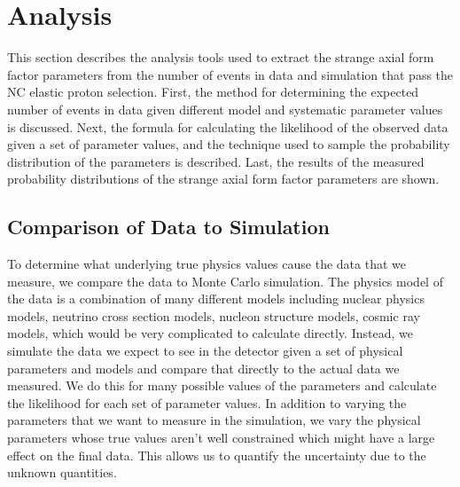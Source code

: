 \section{Analysis}\label{sec:analysis}
\hspace{\parindent}
This section describes the analysis tools used to extract the strange axial
form factor parameters from the number of events in data and simulation that
pass the NC elastic proton selection. First, the method for determining the
expected number of events in data given different model and systematic
parameter values is discussed. Next, the formula for calculating the likelihood
of the observed data given a set of parameter values, and the technique used to
sample the probability distribution of the parameters is described. Last, the
results of the measured probability distributions of the strange axial form
factor parameters are shown.

\subsection{Comparison of Data to Simulation}
  To determine what underlying true physics values cause the data that we
  measure, we compare the data to Monte Carlo simulation. The physics model of
  the data is a combination of many different models including nuclear physics
  models, neutrino cross section models, nucleon structure models, cosmic ray
  models, which would be very complicated to calculate directly.  Instead, we
  simulate the data we expect to see in the detector given a set of physical
  parameters and models and compare that directly to the actual data we
  measured. We do this for many possible values of the parameters and calculate
  the likelihood for each set of parameter values. In addition to varying the
  parameters that we want to measure in the simulation, we vary the physical
  parameters whose true values aren't well constrained which might have a large
  effect on the final data. This allows us to quantify the uncertainty due to
  the unknown quantities.
